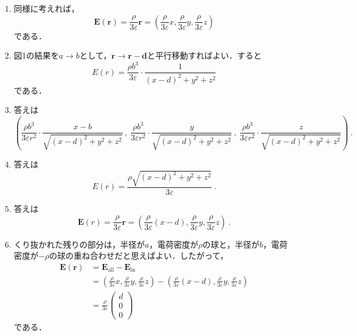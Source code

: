 \documentclass[a4paper,pdflatex,ja=standard]{bxjsarticle}
\begin{document}
\begin{enumerate}
  \item 
  同様に考えれば，
  \begin{equation}
    \bm{E}(\bm{r})
    =
    \frac{\rho}{3\varepsilon}\bm{r}
    =
    \left( 
      \frac{\rho}{3\varepsilon}x ,
      \frac{\rho}{3\varepsilon}y ,
      \frac{\rho}{3\varepsilon}z
    \right)
  \end{equation}
  である．

  \item 
  図1の結果を$a\rightarrow b$として，$\bm{r}\rightarrow\bm{r}-\bm{d}$と平行移動すればよい．すると
  \begin{equation}
    E(r)
    =
    \frac{\rho b^3}{3\varepsilon}
    \cdot
    \frac{1}{(x-d)^2+y^2+z^2}
  \end{equation}
  である．

  \item 
  答えは
  \begin{equation}
    \left(  
      \frac{\rho b^3}{3\varepsilon r^2}\cdot\frac{x-b}{\sqrt{(x-d)^2+y^2+z^2}
      }
      \ ,\ 
      \frac{\rho b^3}{3\varepsilon r^2}\cdot\frac{y}{\sqrt{(x-d)^2+y^2+z^2}}
      \ ,\ 
      \frac{\rho b^3}{3\varepsilon r^2}\cdot\frac{z}{\sqrt{(x-d)^2+y^2+z^2}}
    \right)
    \ .
  \end{equation}

  \item 
  答えは
  \begin{equation}
    E(r)
    =
    \frac{\rho\sqrt{(x-d)^2+y^2+z^2}}{3\varepsilon}
    \ .
  \end{equation}

  \item 
  答えは
  \begin{equation}
    \bm{E}(r)
    =
    \frac{\rho}{3\varepsilon}\bm{\bm{r}}
    =
    \left( 
      \frac{\rho}{3\varepsilon}(x-d) ,
      \frac{\rho}{3\varepsilon}y ,
      \frac{\rho}{3\varepsilon}z
    \right)
    \ .
  \end{equation}

  \item 
  くり抜かれた残りの部分は，半径が$a$，電荷密度が$\rho$の球と，半径が$b$，電荷密度が$-\rho$の球の重ね合わせだと思えばよい．したがって，
  \begin{align}
    \bm{E}(\bm{r})
    &=
    \bm{E}_{\text{all}}
    -
    \bm{E}_{\text{in}}
    \nonumber
    \\
    &=
    \left( 
      \frac{\rho}{3\varepsilon}x ,
      \frac{\rho}{3\varepsilon}y ,
      \frac{\rho}{3\varepsilon}z
    \right)
    -
    \left( 
      \frac{\rho}{3\varepsilon}(x-d) ,
      \frac{\rho}{3\varepsilon}y ,
      \frac{\rho}{3\varepsilon}z
    \right)
    \nonumber
    \\
    &=
    \frac{\rho}{3\varepsilon}
    \begin{pmatrix}
      d \\
      0 \\
      0
    \end{pmatrix}
  \end{align}
  である．


\end{enumerate}
\end{document}
